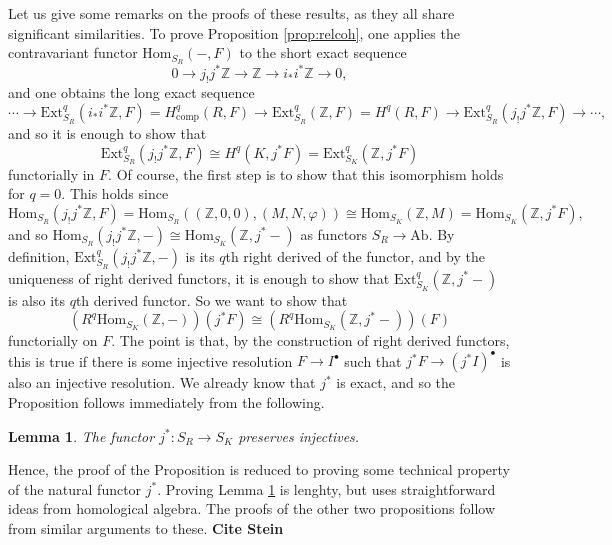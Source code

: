 \documentclass{article}
\newcommand{\Hom}{\mathrm{Hom}}
\newcommand{\Ext}{\mathrm{Ext}}
\newcommand{\comp}{\mathrm{comp}}
\newcommand{\Ab}{\mathrm{Ab}}
\newcommand{\ZZ}{\mathbb{Z}}
\theoremstyle{plain}
\newtheorem{lemma}[theorem]{Lemma}
\theoremstyle{definition}
\begin{document}
    Let us give some remarks on the proofs of these results, as they all share significant similarities. To prove Proposition \ref{prop:relcoh}, one applies the contravariant functor $\Hom_{S_R}(-,F)$ to the short exact sequence 
    $$0\longrightarrow j_!j^*\ZZ\longrightarrow \ZZ\longrightarrow i_*i^*\ZZ\longrightarrow 0,$$
    and one obtains the long exact sequence
    $$\cdots\longrightarrow \Ext_{S_R}^q(i_*i^*\ZZ,F)=H^q_{\comp}(R,F)\longrightarrow \Ext_{S_R}^q(\ZZ,F)=H^q(R,F)\longrightarrow \Ext_{S_R}^q(j_!j^*\ZZ,F)\longrightarrow\cdots,$$
    and so it is enough to show that 
    $$\Ext_{S_R}^q(j_!j^*\ZZ,F)\cong H^q(K,j^*F)=\Ext_{S_K}^q(\ZZ,j^*F)$$ 
    functorially in $F$. Of course, the first step is to show that this isomorphism holds for $q=0$. This holds since
    $$\Hom_{S_R}(j_!j^*\ZZ,F)=\Hom_{S_R}((\ZZ,0,0),(M,N,\varphi))\cong \Hom_{S_K}(\ZZ,M)=\Hom_{S_K}(\ZZ,j^*F),$$
    and so $\Hom_{S_R}(j_!j^*\ZZ,-)\cong\Hom_{S_K}(\ZZ,j^*-)$ as functors $S_R\to\Ab$. By definition, $\Ext^q_{S_R}(j_!j^*\ZZ,-)$ is its $q$th right derived of the functor, and by the uniqueness of right derived functors, it is enough to show that $\Ext^q_{S_K}(\ZZ,j^*-)$ is also its $q$th derived functor. So we want to show that 
    $$(R^q\Hom_{S_K}(\ZZ,-))(j^*F)\cong(R^q\Hom_{S_K}(\ZZ,j^*-))(F)$$
    functorially on $F$. The point is that, by the construction of right derived functors, this is true if there is some injective resolution $F\to I^\bullet$ such that $j^*F\to(j^*I)^\bullet$ is also an injective resolution. We already know that $j^*$ is exact, and so the Proposition follows immediately from the following.
    \begin{lemma}\label{lem:injectives}
        The functor $j^*:S_R\to S_K$ preserves injectives.
    \end{lemma}
    Hence, the proof of the Proposition is reduced to proving some technical property of the natural functor $j^*$. Proving Lemma \ref{lem:injectives} is lenghty, but uses straightforward ideas from homological algebra. The proofs of the other two propositions follow from similar arguments to these. \textbf{Cite Stein}
\end{document}

